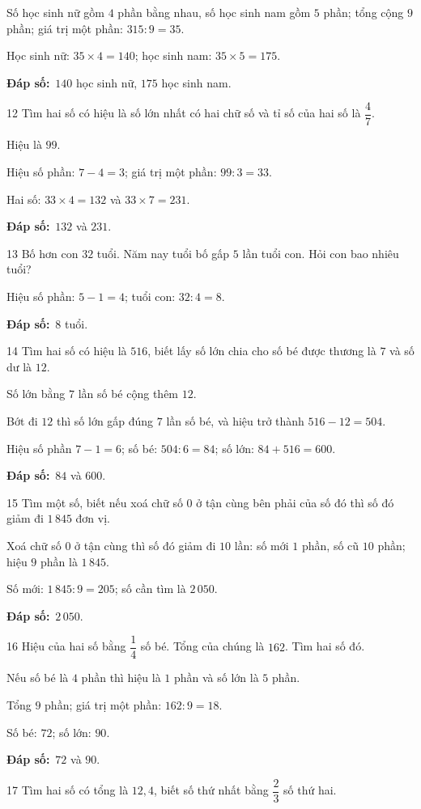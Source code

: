 \documentclass[11pt]{article}
\newif\ifsol \solfalse
\providecommand{\AnsWord}{Đáp số}
\newcommand{\dapso}[1]{\par\textbf{\AnsWord:}\ #1}
\newcommand{\probsol}[1]{%
  \begin{lrbox}{\solmeasure}\begin{minipage}{\dimexpr\linewidth-24pt\relax}#1\end{minipage}\end{lrbox}%
  \ifsol
    \begin{solbox}#1\end{solbox}%
  \else
    \setlength{\solht}{\dimexpr\ht\solmeasure+\dp\solmeasure+0.85cm\relax}%
    \ifdim\solht<1.35cm\setlength{\solht}{1.35cm}\fi
    \begin{tcolorbox}[colback=white,colframe=Line,boxrule=0.8pt,arc=5pt,
      left=8pt,right=8pt,top=4pt,bottom=4pt,height=\solht]{\footnotesize\color{Slate}\itshape\WorkWord}\end{tcolorbox}%
  \fi}
\newcommand{\gap}{\vspace{0.3cm}}
\def\WorkWord{Bài làm:}
\def\AnsWord{Đáp số}
\begin{document}
\probsol{
Số học sinh nữ gồm $4$ phần bằng nhau, số học sinh nam gồm $5$ phần; tổng cộng $9$ phần; giá trị một phần: $315:9=35$.\par
Học sinh nữ: $35\times4=140$; học sinh nam: $35\times5=175$.
\dapso{$140$ học sinh nữ, $175$ học sinh nam.}}
\gap
\begin{probbox}{12}{\relax}
Tìm hai số có hiệu là số lớn nhất có hai chữ số và tỉ số của hai số là $\dfrac47$.
\end{probbox}
\probsol{
Hiệu là $99$.\par Hiệu số phần: $7-4=3$; giá trị một phần: $99:3=33$.\par Hai số: $33\times4=132$ và $33\times7=231$.
\dapso{$132$ và $231$.}}
\gap
\begin{probbox}{13}{\relax}
Bố hơn con $32$ tuổi. Năm nay tuổi bố gấp $5$ lần tuổi con. Hỏi con bao nhiêu tuổi?
\end{probbox}
\probsol{
Hiệu số phần: $5-1=4$; tuổi con: $32:4=8$.
\dapso{$8$ tuổi.}}
\gap
\begin{probbox}{14}{\relax}
Tìm hai số có hiệu là $516$, biết lấy số lớn chia cho số bé được thương là $7$ và số dư là $12$.
\end{probbox}
\probsol{
Số lớn bằng $7$ lần số bé cộng thêm $12$.\par Bớt đi $12$ thì số lớn gấp đúng $7$ lần số bé, và hiệu trở thành $516-12=504$.\par
Hiệu số phần $7-1=6$; số bé: $504:6=84$; số lớn: $84+516=600$.
\dapso{$84$ và $600$.}}
\gap
\begin{probbox}{15}{\relax}
Tìm một số, biết nếu xoá chữ số $0$ ở tận cùng bên phải của số đó thì số đó giảm đi $1\,845$ đơn vị.
\end{probbox}
\probsol{
Xoá chữ số $0$ ở tận cùng thì số đó giảm đi $10$ lần: số mới $1$ phần, số cũ $10$ phần; hiệu $9$ phần là $1\,845$.\par
Số mới: $1\,845:9=205$; số cần tìm là $2\,050$.
\dapso{$2\,050$.}}
\gap
\begin{probbox}{16}{\relax}
Hiệu của hai số bằng $\dfrac14$ số bé. Tổng của chúng là $162$. Tìm hai số đó.
\end{probbox}
\probsol{
Nếu số bé là $4$ phần thì hiệu là $1$ phần và số lớn là $5$ phần.\par Tổng $9$ phần; giá trị một phần: $162:9=18$.\par
Số bé: $72$; số lớn: $90$.
\dapso{$72$ và $90$.}}
\gap
\begin{probbox}{17}{\relax}
Tìm hai số có tổng là $12{,}4$, biết số thứ nhất bằng $\dfrac23$ số thứ hai.
\end{probbox}
\end{document}
